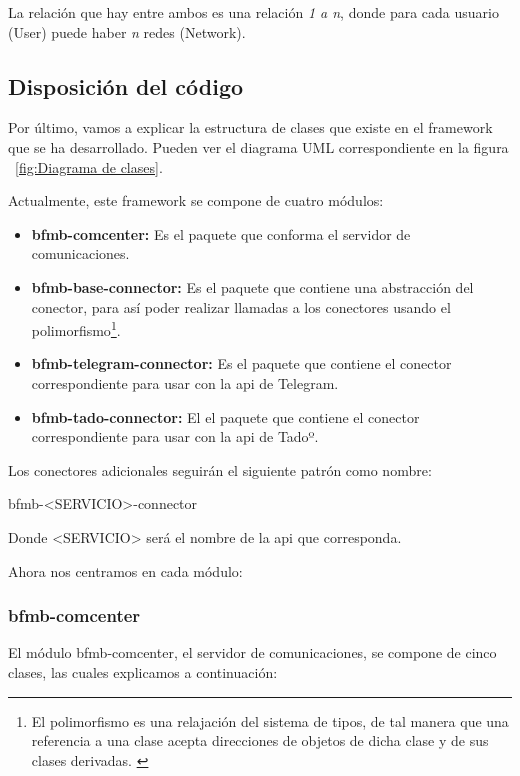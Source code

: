 \documentclass[spanish,12pt, a4paper, twoside]{paper}
\begin{document}
La relación que hay entre ambos es una relación \emph{1 a n}, donde para cada usuario (User) puede haber \emph{n} redes (Network).

\subsection{Disposición del código}

Por último, vamos a explicar la estructura de clases que existe en el framework que se ha desarrollado. Pueden ver el diagrama UML correspondiente en la figura ~\ref{fig:Diagrama de clases}.

Actualmente, este framework se compone de cuatro módulos:

\begin{itemize}
\item\textbf{bfmb-comcenter:} Es el paquete que conforma el servidor de comunicaciones.
\item\textbf{bfmb-base-connector:} Es el paquete que contiene una abstracción del conector, para así poder realizar llamadas a los conectores usando el polimorfismo\footnote{El polimorfismo es una relajación del sistema de tipos, de tal manera que una referencia a una clase acepta direcciones de objetos de dicha clase y de sus clases derivadas. \cite[Def. académica de Fernández, L.]{PgWebPolimorfismo}}.
\item\textbf{bfmb-telegram-connector:} Es el paquete que contiene el conector correspondiente para usar con la api de Telegram.
\item\textbf{bfmb-tado-connector:} El el paquete que contiene el conector correspondiente para usar con la api de Tadoº.
\end{itemize}

Los conectores adicionales seguirán el siguiente patrón como nombre:
\begin{center}bfmb-<SERVICIO>-connector\end{center}
Donde <SERVICIO> será el nombre de la api que corresponda.

Ahora nos centramos en cada módulo:

\subsubsection{bfmb-comcenter}

El módulo bfmb-comcenter, el servidor de comunicaciones, se compone de cinco clases, las cuales explicamos a continuación:
\end{document}
